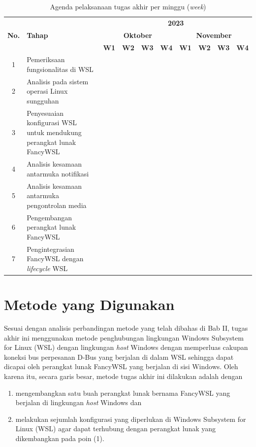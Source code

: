 \begin{table}
    \centering
    \caption{Agenda pelaksanaan tugas akhir per minggu (\textit{week})}
    \begin{tabular}{|c|p{4cm}|c|c|c|c|c|c|c|c|} \hline 
        \multirow{3}{*}{\textbf{No.}} & \multirow{3}{*}{\textbf{Tahap}} & \multicolumn{8}{c|}{\textbf{2023}}\\ \cline{3-10} 
        & & \multicolumn{4}{c|}{\textbf{Oktober}} & \multicolumn{4}{c|}{\textbf{November}}\\ \cline{3-10} 
        & & \textbf{W1} & \textbf{W2} & \textbf{W3} & \textbf{W4} & \textbf{W1} & \textbf{W2} & \textbf{W3} & \textbf{W4}\\ \hline 
        1 & Pemeriksaan fungsionalitas di WSL & \cellcolor{black} &  &  &  &  &  &  & \\ \hline 
        2 & Analisis pada sistem operasi Linux sungguhan & \cellcolor{black} & \cellcolor{black} &  &  &  &  &  & \\ \hline 
        3 & Penyesuaian konfigurasi WSL untuk mendukung perangkat lunak FancyWSL &  &  & \cellcolor{black} & \cellcolor{black} &  &  &  & \\ \hline 
        4 & Analisis kesamaan antarmuka notifikasi &  &  & \cellcolor{black} & \cellcolor{black} & \cellcolor{black} & &  & \\ \hline 
        5 & Analisis kesamaan antarmuka pengontrolan media &  &  & \cellcolor{black} & \cellcolor{black} & \cellcolor{black} &  &  & \\ \hline 
        6 & Pengembangan perangkat lunak FancyWSL &  &  &  &  & \cellcolor{black} & \cellcolor{black} & \cellcolor{black} & \cellcolor{black}\\ \hline 
        7 & Pengintegrasian FancyWSL dengan \textit{lifecycle} WSL &  &  &  &  &  &  &  & \cellcolor{black}\\ \hline 
    \end{tabular}
    \label{tabel-agenda-pelaksanaan}
\end{table}

\section{Metode yang Digunakan}

Sesuai dengan analisis perbandingan metode yang telah dibahas di Bab II, tugas akhir ini menggunakan metode penghubungan lingkungan Windows Subsystem for Linux (WSL) dengan lingkungan \textit{host} Windows dengan memperluas cakupan koneksi bus perpesanan D-Bus yang berjalan di dalam WSL sehingga dapat dicapai oleh perangkat lunak FancyWSL yang berjalan di sisi Windows. Oleh karena itu, secara garis besar, metode tugas akhir ini dilakukan adalah dengan
\begin{enumerate}
    \item mengembangkan satu buah perangkat lunak bernama FancyWSL yang berjalan di lingkungan \textit{host} Windows dan
    \item melakukan sejumlah konfigurasi yang diperlukan di Windows Subsystem for Linux (WSL) agar dapat terhubung dengan perangkat lunak yang dikembangkan pada poin (1).
\end{enumerate}

